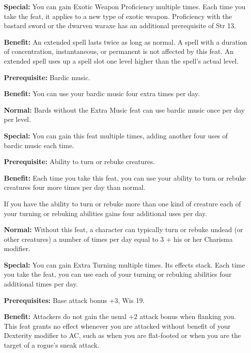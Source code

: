 \textbf{Special:} You can gain Exotic Weapon Proficiency multiple times. Each time 
you take the feat, it applies to a new type of exotic weapon. Proficiency with 
the bastard sword or the dwarven waraxe has an additional prerequisite of Str 13.


\textbf{Benefit:} An extended spell lasts twice as long as normal. A spell with 
a duration of concentration, instantaneous, or permanent is not affected by this 
feat. An extended spell uses up a spell slot one level higher than the spell's 
actual level.


\textbf{Prerequisite:} Bardic music.

\textbf{Benefit:} You can use your bardic music four extra times per day.

\textbf{Normal:} Bards without the Extra Music feat can use bardic music once per 
day per level.

\textbf{Special:} You can gain this feat multiple times, adding another four uses 
of bardic music each time.


\textbf{Prerequisite:} Ability to turn or rebuke creatures.

\textbf{Benefit:} Each time you take this feat, you can use your ability to turn 
or rebuke creatures four more times per day than normal.

If you have the ability to turn or rebuke more than one kind of creature each of 
your turning or rebuking abilities gains four additional uses per day.

\textbf{Normal:} Without this feat, a character can typically turn or rebuke undead 
(or other creatures) a number of times per day equal to 3 + his or her Charisma 
modifier.

\textbf{Special:} You can gain Extra Turning multiple times. Its effects stack. 
Each time you take the feat, you can use each of your turning or rebuking abilities 
four additional times per day.


\textbf{Prerequisites:} Base attack bonus +3, Wis 19.

\textbf{Benefit:} Attackers do not gain the usual +2 attack bonus when flanking 
you. This feat grants no effect whenever you are attacked without benefit of your 
Dexterity modifier to AC, such as when you are flat-footed or when you are the 
target of a rogue's sneak attack.

